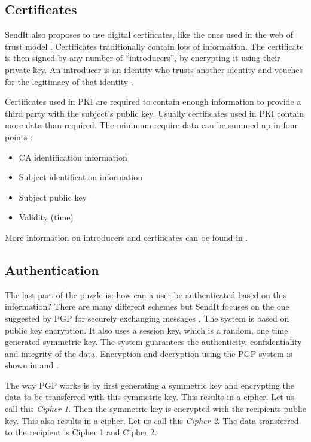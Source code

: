     \subsection{Certificates}
    \label{sec:cert}
    SendIt also proposes to use digital certificates, like the ones used in the web of trust model \cite{ar_pgp}. Certificates traditionally contain lots of information. The certificate is then signed by any number of “introducers”, by encrypting it using their private key. An introducer is an identity who trusts another identity and vouches for the legitimacy of that identity \cite{ar_pgp}.
    
    Certificates used in PKI are required to contain enough information to provide a third party with the subject's public key. Usually certificates used in PKI contain more data than required. The minimum require data can be summed up in four points \cite{vaccaPublicKeyInfrastructure2004}:\\
    \begin{itemize}
        \item CA identification information
        \item Subject identification information
        \item Subject public key
        \item Validity (time)
    \end{itemize}
    More information on introducers and certificates can be found in .

    \subsection{Authentication}
    \label{sec:pgp_enc}
    The last part of the puzzle is: how can a user be authenticated based on this information? There are many different schemes but SendIt focuses on the one suggested by PGP for securely exchanging messages \cite{b_pgp}. The system is based on public key encryption. It also uses a session key, which is a random, one time generated symmetric key. The system guarantees the authenticity, confidentiality and integrity of the data. Encryption and decryption using the PGP system is shown in  and .

    The way PGP works is by first generating a symmetric key and encrypting the data to be transferred with this symmetric key. This results in a cipher. Let us call this \emph{Cipher 1}. Then the symmetric key is encrypted with the recipients public key. This also results in a cipher. Let us call this \emph{Cipher 2}. The data transferred to the recipient is Cipher 1 and Cipher 2.

